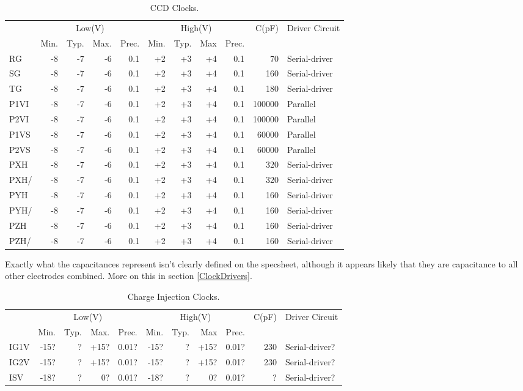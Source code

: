 \documentclass[a4paper,12pt]{article}
\begin{document}
\begin{table}[h]
\centering
\begin{tabular}{|l|rrrr|rrrr|r|l|}
\hline
&\multicolumn{4}{c|}{Low(V)}&\multicolumn{4}{c|}{High(V)}& C(pF)& Driver Circuit \\ 
&Min.&Typ.&Max.&Prec.&Min.&Typ.&Max&Prec.&& \\
\hline
RG & -8 & -7 & -6 & 0.1 & +2 & +3 & +4 & 0.1 & 70 & Serial-driver \\
SG & -8 & -7 & -6 & 0.1 & +2 & +3 & +4 & 0.1 & 160 & Serial-driver \\
TG & -8 & -7 & -6 & 0.1 & +2 & +3 & +4 & 0.1 & 180 & Serial-driver \\
P1VI & -8 & -7 & -6 & 0.1 & +2 & +3 & +4 & 0.1 & 100000 & Parallel \\
P2VI & -8 & -7 & -6 & 0.1 & +2 & +3 & +4 & 0.1 & 100000 & Parallel \\
P1VS & -8 & -7 & -6 & 0.1 & +2 & +3 & +4 & 0.1 & 60000 & Parallel \\
P2VS & -8 & -7 & -6 & 0.1 & +2 & +3 & +4 & 0.1 & 60000 & Parallel \\
PXH & -8 & -7 & -6 & 0.1 & +2 & +3 & +4 & 0.1 & 320 & Serial-driver \\
PXH/ & -8 & -7 & -6 & 0.1 & +2 & +3 & +4 & 0.1 & 320 & Serial-driver \\
PYH & -8 & -7 & -6 & 0.1 & +2 & +3 & +4 & 0.1 & 160 & Serial-driver \\
PYH/ & -8 & -7 & -6 & 0.1 & +2 & +3 & +4 & 0.1 & 160 & Serial-driver \\
PZH & -8 & -7 & -6 & 0.1 & +2 & +3 & +4 & 0.1 & 160 & Serial-driver \\
PZH/ & -8 & -7 & -6 & 0.1 & +2 & +3 & +4 & 0.1 & 160 & Serial-driver \\
\hline
\end{tabular}
 \caption{CCD Clocks.}
 \label{Clocks}
\end{table}

Exactly what the capacitances represent isn't clearly defined on the specsheet, although it appears likely that they are capacitance to all other electrodes combined. More on this in section \ref{ClockDrivers}.

\begin{table}[h]
\centering
\begin{tabular}{|l|rrrr|rrrr|r|l|}
\hline
&\multicolumn{4}{c|}{Low(V)}&\multicolumn{4}{c|}{High(V)}& C(pF)& Driver Circuit \\ 
&Min.&Typ.&Max.&Prec.&Min.&Typ.&Max&Prec.&& \\
\hline
IG1V & -15? & ? & +15? & 0.01? & -15? & ? & +15? & 0.01? & 230 & Serial-driver? \\
IG2V & -15? & ? & +15? & 0.01? & -15? & ? & +15? & 0.01? & 230 & Serial-driver? \\
ISV & -18? & ? & 0? & 0.01? & -18? & ? & 0? & 0.01? & ? & Serial-driver? \\
\hline
\end{tabular}
 \caption{Charge Injection Clocks.}
 \label{CIClocks}
\end{table}
\end{document}
